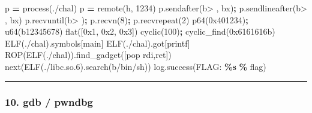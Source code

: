 \documentclass[10pt,a4paper]{article}
\newenvironment{Shaded}{\begin{snugshade}}{\end{snugshade}}
\newcommand{\BaseNTok}[1]{\textcolor[rgb]{0.00,0.00,0.81}{#1}}
\newcommand{\BuiltInTok}[1]{#1}
\newcommand{\DecValTok}[1]{\textcolor[rgb]{0.00,0.00,0.81}{#1}}
\newcommand{\NormalTok}[1]{#1}
\newcommand{\OperatorTok}[1]{\textcolor[rgb]{0.81,0.36,0.00}{\textbf{#1}}}
\newcommand{\SpecialCharTok}[1]{\textcolor[rgb]{0.81,0.36,0.00}{\textbf{#1}}}
\newcommand{\StringTok}[1]{\textcolor[rgb]{0.31,0.60,0.02}{#1}}
\renewenvironment{Shaded}{%
  \def\FrameCommand{\fboxsep=3.2pt\colorbox{shadecolor}}%
  \MakeFramed{\advance\hsize-\width\FrameRestore\small}%
}{%
  \endMakeFramed
}
\begin{document}
\begin{Shaded}
\begin{Highlighting}[]
\NormalTok{p }\OperatorTok{=}\NormalTok{ process(}\StringTok{\textquotesingle{}./chal\textquotesingle{}}\NormalTok{)}
\NormalTok{p }\OperatorTok{=}\NormalTok{ remote(}\StringTok{\textquotesingle{}h\textquotesingle{}}\NormalTok{, }\DecValTok{1234}\NormalTok{)}
\NormalTok{p.sendafter(}\StringTok{b\textquotesingle{}\textgreater{} \textquotesingle{}}\NormalTok{, }\StringTok{b\textquotesingle{}x\textquotesingle{}}\NormalTok{)}\OperatorTok{;}\NormalTok{  p.sendlineafter(}\StringTok{b\textquotesingle{}\textgreater{} \textquotesingle{}}\NormalTok{, }\StringTok{b\textquotesingle{}x\textquotesingle{}}\NormalTok{)}
\NormalTok{p.recvuntil(}\StringTok{b\textquotesingle{}\textgreater{} \textquotesingle{}}\NormalTok{)}\OperatorTok{;}\NormalTok{        p.recvn(}\DecValTok{8}\NormalTok{)}\OperatorTok{;}\NormalTok{   p.recvrepeat(}\DecValTok{2}\NormalTok{)}
\NormalTok{p64(}\BaseNTok{0x401234}\NormalTok{)}\OperatorTok{;}\NormalTok{             u64(}\StringTok{b\textquotesingle{}12345678\textquotesingle{}}\NormalTok{)}
\NormalTok{flat([}\BaseNTok{0x1}\NormalTok{, }\BaseNTok{0x2}\NormalTok{, }\BaseNTok{0x3}\NormalTok{])}
\NormalTok{cyclic(}\DecValTok{100}\NormalTok{)}\OperatorTok{;}\NormalTok{               cyclic\_find(}\BaseNTok{0x6161616b}\NormalTok{)}
\NormalTok{ELF(}\StringTok{\textquotesingle{}./chal\textquotesingle{}}\NormalTok{).symbols[}\StringTok{\textquotesingle{}main\textquotesingle{}}\NormalTok{]}
\NormalTok{ELF(}\StringTok{\textquotesingle{}./chal\textquotesingle{}}\NormalTok{).got[}\StringTok{\textquotesingle{}printf\textquotesingle{}}\NormalTok{]}
\NormalTok{ROP(ELF(}\StringTok{\textquotesingle{}./chal\textquotesingle{}}\NormalTok{)).find\_gadget([}\StringTok{\textquotesingle{}pop rdi\textquotesingle{}}\NormalTok{,}\StringTok{\textquotesingle{}ret\textquotesingle{}}\NormalTok{])}
\BuiltInTok{next}\NormalTok{(ELF(}\StringTok{\textquotesingle{}./libc.so.6\textquotesingle{}}\NormalTok{).search(}\StringTok{b\textquotesingle{}/bin/sh\textquotesingle{}}\NormalTok{))}
\NormalTok{log.success(}\StringTok{\textquotesingle{}FLAG: }\SpecialCharTok{\%s}\StringTok{\textquotesingle{}} \OperatorTok{\%}\NormalTok{ flag)}
\end{Highlighting}
\end{Shaded}

\begin{center}\rule{0.5\linewidth}{0.5pt}\end{center}

\subsubsection{10. gdb / pwndbg}\label{gdb-pwndbg}
\end{document}
